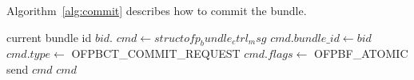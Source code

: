 \documentclass[conference]{sigcomm-alternate}
\begin{document}
Algorithm~\ref{alg:commit} describes how to commit
the bundle. 
\begin{algorithm}[h]
    \caption{$\textit{try-commit}()$}
    \label{alg:commit}
    \begin{algorithmic}[1]
    \Require  current bundle id $bid$.
		    \State $cmd \gets struct ofp_bundle_ctrl_msg$
    		\State  $cmd.bundle\_id \gets bid$
    		\State  $cmd.type \gets $ \textsf{OFPBCT\_COMMIT\_REQUEST}
    		\State  $cmd.flags \gets $ \textsf{OFPBF\_ATOMIC}
    		\State send $cmd$
		\Return $cmd$
    \end{algorithmic}
\end{algorithm}

%
\end{document}
